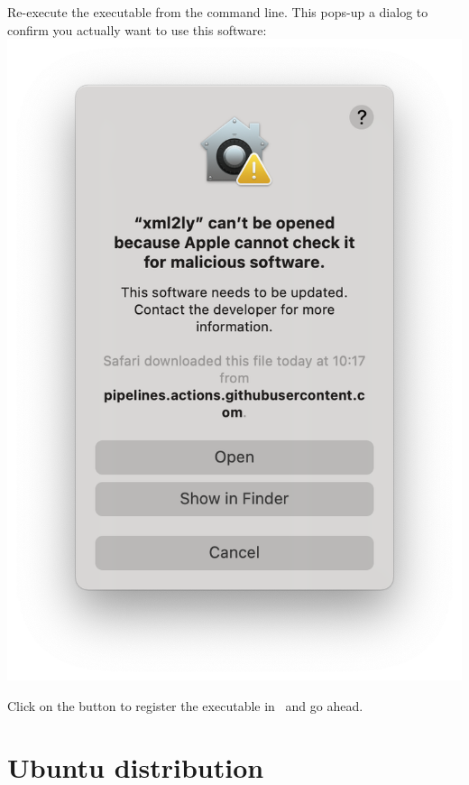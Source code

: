 Re-execute the executable from the command line. This pops-up a dialog to confirm you actually want to use this software:\\
\includegraphics[scale=0.35]{../graphics/MacOSConfirmOpening.png}

Click on the  button to register the executable in \Gatekeeper\ and go ahead.


\section{Ubuntu distribution}


